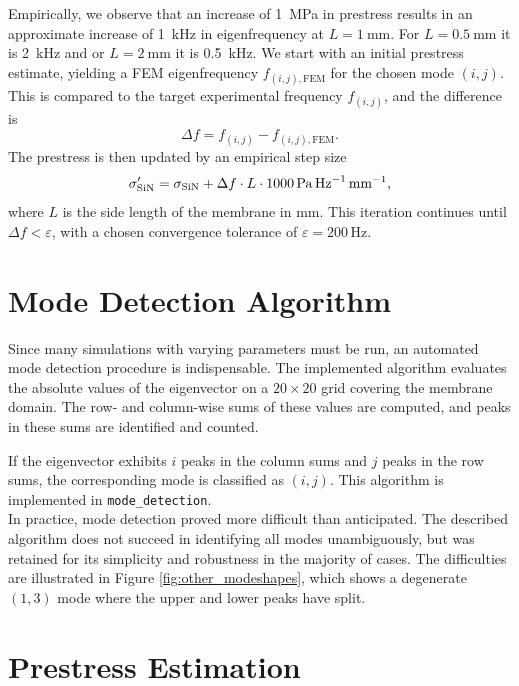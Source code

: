 Empirically, we observe that an increase of \SI{1}{\mega\pascal} in prestress results in an approximate increase of \SI{1}{\kilo\hertz} in eigenfrequency at $L=\SI{1}{\milli\meter}$. For $L=\SI{0.5}{\milli\meter}$ it is \SI{2}{\kilo\hertz} and or $L=\SI{2}{\milli\meter}$ it is \SI{0.5}{\kilo\hertz}. We start with an initial prestress estimate, yielding a FEM eigenfrequency $f_{(i,j),\mathrm{FEM}}$ for the chosen mode $(i,j)$. This is compared to the target experimental frequency $f_{(i,j)}$, and the difference is
\[
\Delta f = f_{(i,j)} - f_{(i,j),\mathrm{FEM}}.
\]
The prestress is then updated by an empirical step size
\[
\sigma_{\mathrm{SiN}}' = \sigma_{\mathrm{SiN}} + \Delta f \cdot L \cdot \SI{1000}{\pascal\per\hertz\per\milli\meter},
\]
where $L$ is the side length of the membrane in \si{\milli\meter}. This iteration continues until $\Delta f < \varepsilon$, with a chosen convergence tolerance of $\varepsilon = 200\,\mathrm{Hz}$.\\

\section{Mode Detection Algorithm}

Since many simulations with varying parameters must be run, an automated mode detection procedure is indispensable. The implemented algorithm evaluates the absolute values of the eigenvector on a $20 \times 20$ grid covering the membrane domain. The row- and column-wise sums of these values are computed, and peaks in these sums are identified and counted.  

If the eigenvector exhibits $i$ peaks in the column sums and $j$ peaks in the row sums, the corresponding mode is classified as $(i,j)$. This algorithm is implemented in \texttt{mode\_detection}.\\

In practice, mode detection proved more difficult than anticipated. The described algorithm does not succeed in identifying all modes unambiguously, but was retained for its simplicity and robustness in the majority of cases. The difficulties are illustrated in Figure \ref{fig:other_modeshapes}, which shows a degenerate $(1,3)$ mode where the upper and lower peaks have split.\\

\section{Prestress Estimation}


